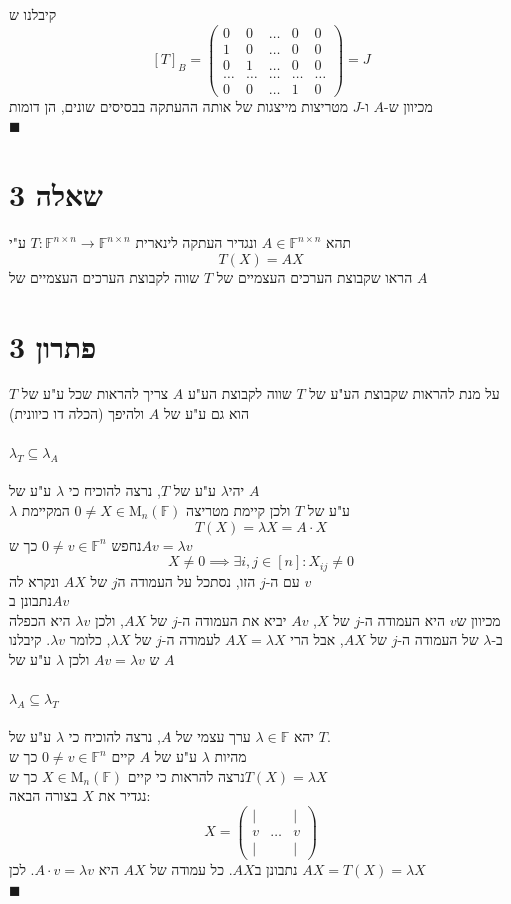 \documentclass[12pt, titlepage]{article}
\begin{document}
קיבלנו ש
\[
    \left[T\right]_B = \begin{pmatrix}
        0 & 0 & \ldots & 0 & 0 \\
        1 & 0 & \ldots & 0 & 0 \\
        0 & 1 & \ldots & 0 & 0 \\
        \ldots & \ldots & \ldots & \ldots & \ldots \\
        0 & 0 & \ldots & 1 & 0
\end{pmatrix} = J
\]
מכיוון ש-$A$ ו-$J$ מטריצות מייצגות של אותה ההעתקה בבסיסים שונים, הן דומות\\
$\blacksquare$
\newpage
\part*{שאלה 3}
תהא $A\in\mathbb{F}^{n\times n}$ ונגדיר העתקה לינארית $T:\mathbb{F}^{n\times n} \to \mathbb{F}^{n \times n}$ ע"י
\[
    T\left(X\right) = AX
\]
הראו שקבוצת הערכים העצמיים של $T$ שווה לקבוצת הערכים העצמיים של $A$
\newpage
\part*{פתרון 3}
על מנת להראות שקבוצת הע"ע של $T$ שווה לקבוצת הע"ע $A$ צריך להראות שכל ע"ע של $T$ הוא גם ע"ע של $A$ ולהיפך (הכלה דו כיוונית)
\subsection*{$\lambda_T\subseteq\lambda_A$}
יהי$\lambda$ ע"ע של $T$, נרצה להוכיח כי $\lambda$ ע"ע של $A$\\
$\lambda$ ע"ע של $T$ ולכן קיימת מטריצה $0\neq X\in\mathrm{M}_n\left(\mathbb{F}\right)$ המקיימת
\[
    T\left(X\right) = \lambda X = A\cdot X
\]
נחפש $0\neq v\in\mathbb{F}^{n}$ כך ש$Av = \lambda v$
\[
    X\neq 0 \implies \exists i,j \in \left[n\right]: X_{ij} \neq 0
\]
עם ה-$j$ הזו, נסתכל על העמודה ה$j$ של $AX$ ונקרא לה $v$ \\
נתבונן ב$Av$ \\
מכיוון ש$v$ היא העמודה ה-$j$ של $X$, $Av$ יביא את העמודה ה-$j$ של $AX$, ולכן $\lambda v$ היא הכפלה ב-$\lambda$ של העמודה ה-$j$ של $AX$, אבל הרי $AX=\lambda X$ לעמודה ה-$j$ של $\lambda X$, כלומר $\lambda v$. קיבלנו ש $Av = \lambda v$ ולכן $\lambda$ ע"ע של $A$
\subsection*{$\lambda_A\subseteq\lambda_T$}
יהא $\lambda \in \mathbb{F}$ ערך עצמי של $A$, נרצה להוכיח כי $\lambda$ ע"ע של $T$.\\
מהיות $\lambda$ ע"ע של $A$ קיים $0\neq v \in \mathbb{F}^n$ כך ש\\
נרצה להראות כי קיים $X\in\mathrm{M}_n\left(\mathbb{F}\right)$ כך ש$T\left(X\right)=\lambda X$\\
נגדיר את $X$ בצורה הבאה:
\[
    X = \begin{pmatrix}
        \vert & & \vert\\
        v & \ldots & v\\
        \vert & & \vert
    \end{pmatrix}
\]
נתבונן ב$AX$. כל עמודה של $AX$ היא $A\cdot v=\lambda v$. לכן $AX = T\left(X\right) =\lambda X$ \\
$\blacksquare$
\newpage
\end{document}
